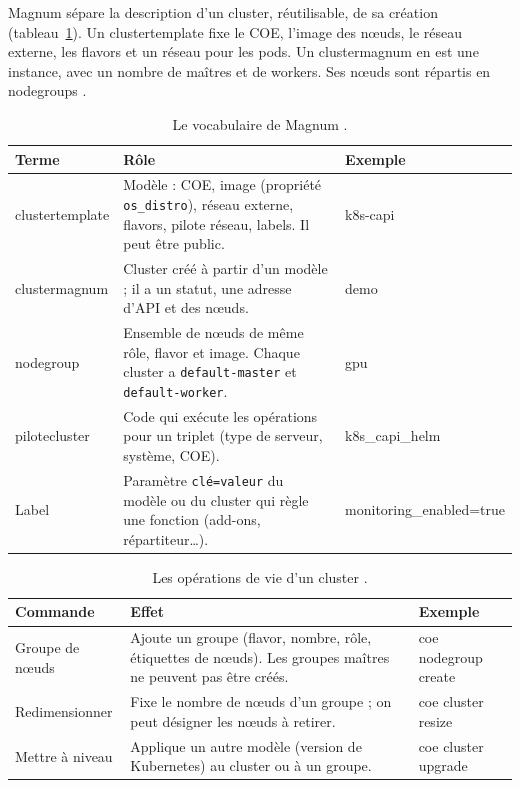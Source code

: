 Magnum sépare la description d'un cluster, réutilisable, de sa création (tableau~\ref{tab:ma-objets}). Un
\gls{clustertemplate} fixe le COE, l'image des nœuds, le réseau externe, les flavors et un réseau pour les pods. Un
\gls{clustermagnum} en est une instance, avec un nombre de maîtres et de workers. Ses nœuds sont répartis en
\glspl{nodegroup} \parencite{magnum-user,magnum-nodegroups}.

\begin{table}[!ht]
\centering
\renewcommand{\arraystretch}{1.3}
\begin{tabular}{@{}>{\raggedright\arraybackslash}p{3.2cm}>{\raggedright\arraybackslash}p{8.6cm}>{\raggedright\arraybackslash\ttfamily\small}p{3.7cm}@{}}
\toprule
\textbf{Terme} & \textbf{Rôle} & \textrm{\textbf{Exemple}} \\
\midrule
\Gls{clustertemplate} & Modèle : COE, image (propriété \texttt{os\_distro}), réseau externe, flavors, pilote réseau, labels. Il peut être public. & k8s-capi \\
\Gls{clustermagnum} & Cluster créé à partir d'un modèle ; il a un statut, une adresse d'API et des nœuds. & demo \\
\Gls{nodegroup} & Ensemble de nœuds de même rôle, flavor et image. Chaque cluster a \texttt{default-master} et \texttt{default-worker}. & gpu \\
\Gls{pilotecluster} & Code qui exécute les opérations pour un triplet (type de serveur, système, COE). & k8s\_capi\_helm \\
Label & Paramètre \texttt{clé=valeur} du modèle ou du cluster qui règle une fonction (add-ons, répartiteur\dots). & monitoring\_\allowbreak enabled=true \\
\bottomrule
\end{tabular}
\caption{Le vocabulaire de Magnum \parencite{magnum-user,magnum-capi-helm-config}.}
\label{tab:ma-objets}
\end{table}

\begin{table}[!ht]
\centering
\renewcommand{\arraystretch}{1.3}
\begin{tabular}{@{}>{\raggedright\arraybackslash}p{3.2cm}>{\raggedright\arraybackslash}p{8.0cm}>{\raggedright\arraybackslash\ttfamily\small}p{4.3cm}@{}}
\toprule
\textbf{Commande} & \textbf{Effet} & \textrm{\textbf{Exemple}} \\
\midrule
Groupe de nœuds & Ajoute un groupe (flavor, nombre, rôle, étiquettes de nœuds). Les groupes maîtres ne peuvent pas être créés. & coe nodegroup create \\
Redimensionner & Fixe le nombre de nœuds d'un groupe ; on peut désigner les nœuds à retirer. & coe cluster resize \\
Mettre à niveau & Applique un autre modèle (version de Kubernetes) au cluster ou à un groupe. & coe cluster upgrade \\
\bottomrule
\end{tabular}
\caption{Les opérations de vie d'un cluster \parencite{magnum-nodegroups,osc-coe}.}
\label{tab:ma-operations}
\end{table}

